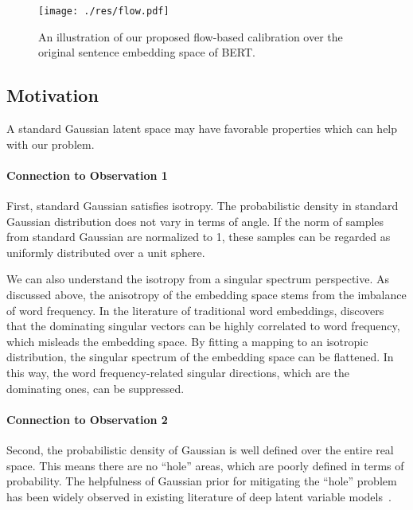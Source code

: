 \documentclass[11pt,a4paper]{article}
\begin{document}
\begin{figure}[!t]
	\centering
	\texttt{[image: ./res/flow.pdf]}
	\vspace{-20pt}
	\caption{\label{fig:flow} An illustration of our proposed flow-based calibration over the original sentence embedding space of BERT. }
	\vspace{-10pt}
\end{figure}

\subsection{Motivation}
A standard Gaussian latent space may have favorable properties which can help with our problem. 

\paragraph{Connection to Observation 1} First, standard Gaussian satisfies isotropy. The probabilistic density in standard Gaussian distribution does not vary in terms of angle. If the  norm of samples from standard Gaussian are normalized to 1, these samples can be regarded as uniformly distributed over a unit sphere.

We can also understand the isotropy from a singular spectrum perspective. As discussed above, the anisotropy of the embedding space stems from the imbalance of word frequency. In the literature of traditional word embeddings, \citet{mu2017all} discovers that the dominating singular vectors can be highly correlated to word frequency, which misleads the embedding space. By fitting a mapping to an isotropic distribution, the singular spectrum of the embedding space can be flattened. In this way, the word frequency-related singular directions, which are the dominating ones, can be suppressed. 

\paragraph{Connection to Observation 2} Second, the probabilistic density of Gaussian is well defined over the entire real space. This means there are no ``hole'' areas, which are poorly defined in terms of probability. The helpfulness of Gaussian prior for mitigating the ``hole'' problem has been widely observed in existing literature of deep latent variable models~\citep{rezende2018taming,li2019surprisingly,ghosh2019variational}.
\end{document}

